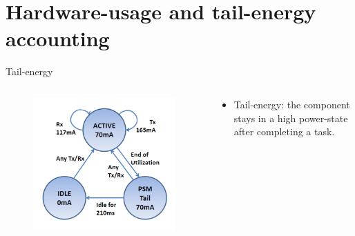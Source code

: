 \section{Hardware-usage and tail-energy accounting}
\begin{frame}{Tail-energy}
\begin{columns}
\begin{column}{0.5\textwidth}
\begin{figure}
	\includegraphics[width=\textwidth]{figures/wifi_statemachine.png} 
\end{figure}
\end{column}
\pause
\begin{column}{0.5\textwidth}
\begin{itemize}
\item Tail-energy: the component stays in a high power-state \alert{after} completing a task.
\end{itemize}
\end{column}
\end{columns}
\end{frame}
%
%
